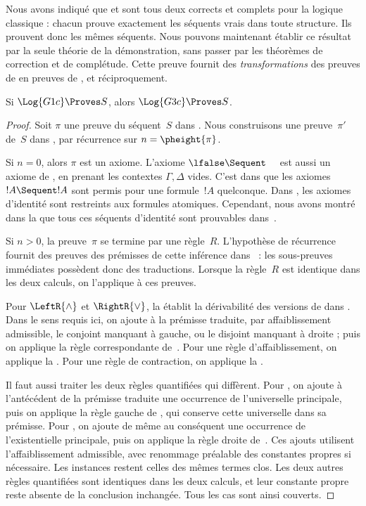 \documentclass[../../../include/open-logic-section]{subfiles}
\begin{document}


Nous avons indiqué que  et  sont tous deux
corrects et complets pour la logique classique : chacun prouve
exactement les séquents vrais dans toute structure.
Ils prouvent donc les mêmes séquents. Nous pouvons maintenant
établir ce résultat par la seule théorie de la démonstration,
sans passer par les théorèmes de correction et de complétude.
Cette preuve fournit des \emph{transformations} des preuves
de  en preuves de , et réciproquement.

\begin{prop}
Si $\Log{G1c} \Proves S$, alors $\Log{G3c} \Proves S$.
\end{prop}

\begin{proof}
Soit $\pi$ une preuve du séquent~$S$ dans .
Nous construisons une preuve~$\pi'$ de~$S$ dans ,
par récurrence sur $n = \pheight{\pi}$.

Si $n = 0$, alors $\pi$ est un axiome.
L'axiome $\lfalse \Sequent \quad$ est aussi un axiome de
, en prenant les contextes $\Gamma, \Delta$ vides.
C'est dans  que les axiomes $!A \Sequent !A$
sont permis pour une formule~$!A$ quelconque.
Dans , les axiomes d'identité sont restreints
aux formules atomiques. Cependant, nous avons montré dans la
 que tous ces séquents d'identité
sont prouvables dans~.

Si $n>0$, la preuve~$\pi$ se termine par une règle~$R$.
L'hypothèse de récurrence fournit des preuves des prémisses
de cette inférence dans~ : les sous-preuves immédiates
possèdent donc des traductions. Lorsque la règle~$R$ est
identique dans les deux calculs, on l'applique à ces preuves.

Pour $\LeftR{\land}$ et $\RightR{\lor}$, la
 établit la dérivabilité des versions
de  dans . Dans le sens requis ici,
on ajoute à la prémisse traduite, par affaiblissement admissible,
le conjoint manquant à gauche, ou le disjoint manquant à droite ;
puis on applique la règle correspondante de~.
Pour une règle d'affaiblissement, on applique la
. Pour une règle de contraction,
on applique la .

Il faut aussi traiter les deux règles quantifiées qui diffèrent.
Pour \LeftR{\lforall}, on ajoute à l'antécédent de la prémisse
traduite une occurrence de l'universelle principale, puis
on applique la règle gauche de , qui conserve cette
universelle dans sa prémisse. Pour \RightR{\lexists},
on ajoute de même au conséquent une occurrence de
l'existentielle principale, puis on applique la règle droite
de~. Ces ajouts utilisent l'affaiblissement admissible,
avec renommage préalable des constantes propres si nécessaire.
Les instances restent celles des mêmes termes clos.
Les deux autres règles quantifiées sont identiques dans les
deux calculs, et leur constante propre reste absente de la
conclusion inchangée. Tous les cas sont ainsi couverts.
\end{proof}
\end{document}

